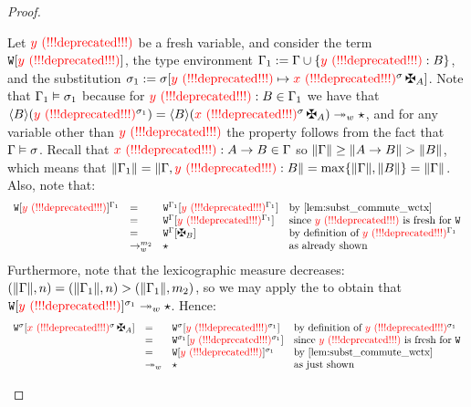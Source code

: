 \begin{proof}
\begin{enumerate}
\begin{enumerate}
    Let $\textcolor{red}{y \text{\,\,(!!!deprecated!!!)}}$ be a fresh variable, and consider
    the term $\mathtt{W}[\textcolor{red}{y \text{\,\,(!!!deprecated!!!)}}]$,
    the type environment $\Gamma_1 := \Gamma\cup\{\textcolor{red}{y \text{\,\,(!!!deprecated!!!)}}:B\}$,
    and the substitution $\subst_1 := \subst\extsub{\vartwo}{\subs{\var}{\subst}\,\gen{\typ}}$.
    Note that $\Gamma_1\vDash\sigma_1$
    because for $\textcolor{red}{y \text{\,\,(!!!deprecated!!!)}}:B\in\Gamma_1$
    we have that
    $\verif{\typtwo}{(\vartwo^{\subst_1})}
    = \verif{\typtwo}{(\var^{\subst}\,\gen{\typ})}
    \tows \iunit$,
    and for any variable other than $\textcolor{red}{y \text{\,\,(!!!deprecated!!!)}}$ the property
    follows from the fact that $\Gamma\vDash\sigma$.
    Recall that $\textcolor{red}{x \text{\,\,(!!!deprecated!!!)}}:A\to B \in \Gamma$
    so $\lVert\Gamma\rVert \geq \lVert A\to B\rVert > \lVert B\rVert$,
    which means that
    $\lVert\Gamma_1\rVert
     = \lVert\Gamma,\textcolor{red}{y \text{\,\,(!!!deprecated!!!)}}:B\rVert
     = \max\{\lVert\Gamma\rVert,\lVert B\rVert\}
     = \lVert\Gamma\rVert$.
    Also, note that:
    \[
      \begin{array}{rlll}
        \subs{\ctxof{\wctx}{\vartwo}}{\tenv_1}
      & = &
        \ctxof{\subs{\wctx}{\tenv_1}}{\subs{\vartwo}{\tenv_1}}
        & \text{by \cref{lem:subst_commute_wctx}}
      \\
      & = &
        \ctxof{\subs{\wctx}{\tenv}}{\subs{\vartwo}{\tenv_1}}
        & \text{since $\vartwo$ is fresh for $\wctx$}
      \\
      & = &
        \ctxof{\subs{\wctx}{\tenv}}{\gen{\typtwo}}
        & \text{by definition of $\subs{\vartwo}{\tenv_1}$}
      \\
      & \tow^{m_2} &
        \iunit
        & \text{as already shown}
      \end{array}
    \]
    Furthermore, note that the lexicographic measure decreases:
    $(\lVert\Gamma\rVert,n)
     = (\lVert\Gamma_1\rVert,n)
     > (\lVert\Gamma_1\rVert,m_2)$,
    so we may apply the \ih to obtain that
    $\mathtt{W}[\textcolor{red}{y \text{\,\,(!!!deprecated!!!)}}]^{\sigma_1} \twoheadrightarrow_{w} \star$.
    Hence:
    \[
      \begin{array}{rlll}
        \ctxof{\subs{\wctx}{\subst}}{\subs{\var}{\subst}\,\gen{\typ}}
      & = &
        \ctxof{\subs{\wctx}{\subst}}{\subs{\vartwo}{\subst_1}}
        & \text{by definition of $\subs{\vartwo}{\subst_1}$}
      \\
      & = &
        \ctxof{\subs{\wctx}{\subst_1}}{\subs{\vartwo}{\subst_1}}
        & \text{since $\vartwo$ is fresh for $\wctx$}
      \\
      & = &
        \subs{\ctxof{\wctx}{\vartwo}}{\subst_1}
        & \text{by \cref{lem:subst_commute_wctx}}
      \\
      & \tows &
        \iunit
        & \text{as just shown}
      \end{array}
    \]


\end{enumerate}
\end{enumerate}
\end{proof}
